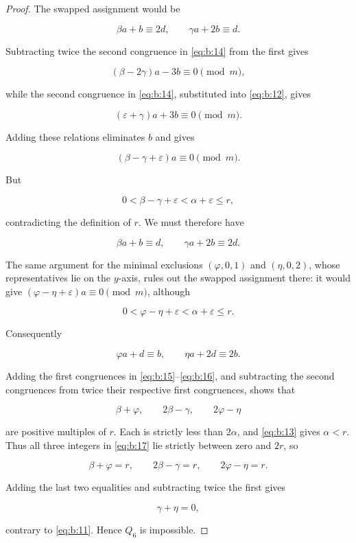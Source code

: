 \begin{proof}
The swapped assignment would be

\begin{equation}
\beta a+b\equiv2d,
\qquad
\gamma a+2b\equiv d.
\label{eq:b:14}
\end{equation}

Subtracting twice the second congruence in \eqref{eq:b:14} from the first gives

\[
(\beta-2\gamma)a-3b\equiv0\pmod m,
\]

while the second congruence in \eqref{eq:b:14}, substituted into \eqref{eq:b:12}, gives

\[
(\varepsilon+\gamma)a+3b\equiv0\pmod m.
\]

Adding these relations eliminates \(b\) and gives

\[
(\beta-\gamma+\varepsilon)a\equiv0\pmod m.
\]

But

\[
0<\beta-\gamma+\varepsilon
<\alpha+\varepsilon\le r,
\]

contradicting the definition of \(r\). We must therefore have

\begin{equation}
\beta a+b\equiv d,
\qquad
\gamma a+2b\equiv2d.
\label{eq:b:15}
\end{equation}

The same argument for the minimal exclusions
\((\varphi,0,1)\) and \((\eta,0,2)\), whose representatives lie on the
\(y\)-axis, rules out the swapped assignment there: it would give
\((\varphi-\eta+\varepsilon)a\equiv0\pmod m\), although

\[
0<\varphi-\eta+\varepsilon<\alpha+\varepsilon\le r.
\]

Consequently

\begin{equation}
\varphi a+d\equiv b,
\qquad
\eta a+2d\equiv2b.
\label{eq:b:16}
\end{equation}

Adding the first congruences in \eqref{eq:b:15}--\eqref{eq:b:16}, and subtracting the second
congruences from twice their respective first congruences, shows that

\begin{equation}
\beta+\varphi,
\qquad
2\beta-\gamma,
\qquad
2\varphi-\eta
\label{eq:b:17}
\end{equation}

are positive multiples of \(r\). Each is strictly less than \(2\alpha\),
and \eqref{eq:b:13} gives \(\alpha<r\). Thus all three integers in \eqref{eq:b:17} lie strictly
between zero and \(2r\), so

\[
\beta+\varphi=r,
\qquad
2\beta-\gamma=r,
\qquad
2\varphi-\eta=r.
\]

Adding the last two equalities and subtracting twice the first gives

\[
\gamma+\eta=0,
\]

contrary to \eqref{eq:b:11}. Hence \(Q_6\) is impossible.
\end{proof}

